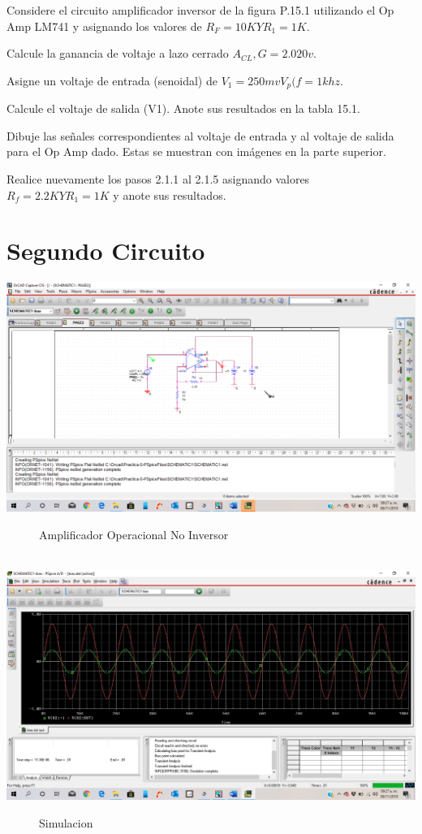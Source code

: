 \documentclass[10pt,a4paper]{article}
\begin{document}
Considere el circuito amplificador inversor de la figura P.15.1 utilizando el Op Amp LM741 y asignando los valores de $R_F = 10K Y R_1 = 1K.$

Calcule la ganancia de voltaje a lazo cerrado $A_{CL}, G = 2.020v$.

Asigne un voltaje de entrada (senoidal) de $V_1 =250mv V_p (f = 1khz.$

Calcule el voltaje de salida (V1). Anote sus resultados en la tabla 15.1.

Dibuje las señales correspondientes al voltaje de entrada y al voltaje de salida para el Op Amp dado. Estas se muestran con imágenes en la parte superior.

Realice nuevamente los pasos 2.1.1 al 2.1.5 asignando valores $R_f = 2.2K Y R_1 = 1K$ y anote sus resultados.


\section{Segundo Circuito}
\begin{center}
 \includegraphics[scale=0.2]{3.png}
 \begin{figure}[hbtp]
 \caption{Amplificador Operacional No Inversor}
 \centering
 \end{figure}\\
  \includegraphics[scale=0.2]{4.png}
 \begin{figure}[hbtp]
 \caption{Simulacion}
 \centering
 \end{figure} 
\end{center}
\end{document}

